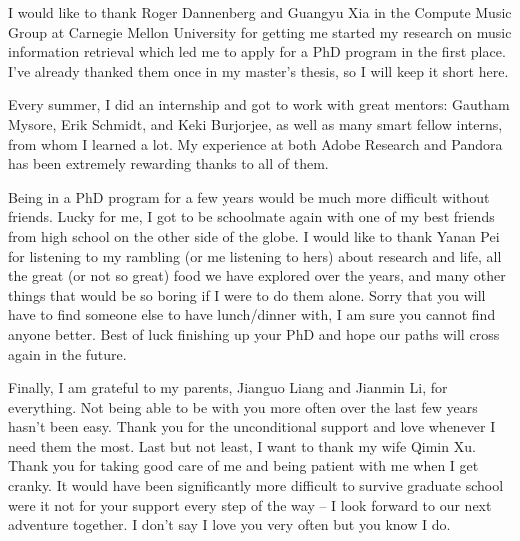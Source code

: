 I would like to thank Roger Dannenberg and Guangyu Xia in the Compute Music Group at Carnegie Mellon University for getting me started my research on music information retrieval which led me to apply for a PhD program in the first place. I've already thanked them once in my master's thesis, so I will keep it short here.

Every summer, I did an internship and got to work with great mentors: Gautham Mysore, Erik Schmidt, and Keki Burjorjee, as well as many smart fellow interns, from whom I learned a lot. My experience at both Adobe Research and Pandora has been extremely rewarding thanks to all of them.

Being in a PhD program for a few years would be much more difficult without friends. Lucky for me, I got to be schoolmate again with one of my best friends from high school on the other side of the globe. I would like to thank Yanan Pei for listening to my rambling (or me listening to hers) about research and life, all the great (or not so great) food we have explored over the years, and many other things that would be so boring if I were to do them alone. Sorry that you will have to find someone else to have lunch/dinner with, I am sure you cannot find anyone better. Best of luck finishing up your PhD and hope our paths will cross again in the future.

Finally, I am grateful to my parents, Jianguo Liang and Jianmin Li, for everything. Not being able to be with you more often over the last few years hasn't been easy. Thank you for the unconditional support and love whenever I need them the most. Last but not least, I want to thank my wife Qimin Xu. Thank you for taking good care of me and being patient with me when I get cranky. It would have been significantly more difficult to survive graduate school were it not for your support every step of the way -- I look forward to our next adventure together. I don't say I love you very often but you know I do. 
